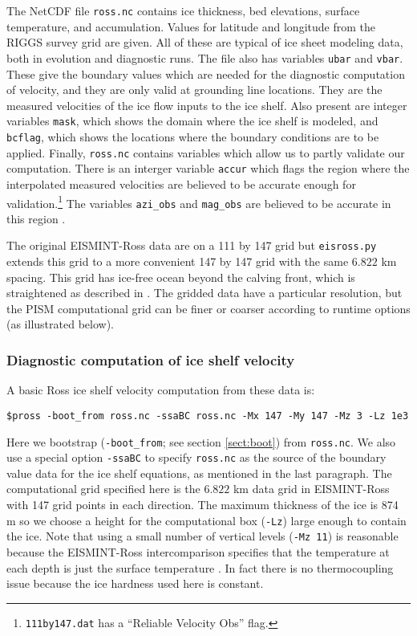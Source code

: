The NetCDF file \texttt{ross.nc} contains ice thickness, bed elevations, surface temperature, and accumulation.  Values for latitude and longitude from the RIGGS survey grid \cite{RIGGS1} are given.  All of these are typical of ice sheet modeling data, both in evolution and diagnostic runs.  The file also has variables \texttt{ubar} and \texttt{vbar}.  These give the boundary values which are needed for the diagnostic computation of velocity, and they are only valid at grounding line locations.  They are the measured velocities of the ice flow inputs to the ice shelf.  Also present are integer variables \texttt{mask}, which shows the domain where the ice shelf is modeled, and \texttt{bcflag}, which shows the locations where the boundary conditions are to be applied.  Finally, \texttt{ross.nc} contains variables which allow us to partly validate our computation.  There is an interger variable \texttt{accur} which flags the region where the interpolated measured velocities are believed to be accurate enough for validation.\footnote{\texttt{111by147.dat} has a ``Reliable Velocity Obs'' flag.}  The variables \texttt{azi_obs} and \texttt{mag_obs} are believed to be accurate in this region \cite{MacAyealetal}.

The original EISMINT-Ross data are on a 111 by 147 grid but \texttt{eisross.py} extends this grid to a more convenient 147 by 147 grid with the same $6.822$ km spacing.  This grid has ice-free ocean beyond the calving front, which is straightened as described in \cite{MacAyealetal}.  The gridded data have a particular resolution, but the PISM computational grid can be finer or coarser according to runtime options (as illustrated below).

\subsubsection*{Diagnostic computation of ice shelf velocity}  A basic Ross ice shelf velocity computation from these data is:

\begin{verbatim}
$pross -boot_from ross.nc -ssaBC ross.nc -Mx 147 -My 147 -Mz 3 -Lz 1e3
\end{verbatim}
Here we bootstrap (\texttt{-boot_from}; see section \ref{sect:boot}) from \texttt{ross.nc}.  We also use a special option \texttt{-ssaBC} to specify \texttt{ross.nc} as the source of the boundary value data for the ice shelf equations, as mentioned in the last paragraph.  The computational grid specified here is the $6.822$ km data grid in EISMINT-Ross with 147 grid points in each direction.  The maximum thickness of the ice is 874 m so we choose a height for the computational box (\texttt{-Lz}) large enough to contain the ice.  Note that using a small number of vertical levels (\texttt{-Mz 11}) is reasonable because the EISMINT-Ross intercomparison specifies that the temperature at each depth is just the surface temperature \cite{MacAyealetal}.  In fact there is no thermocoupling issue because the ice hardness used here is constant.

